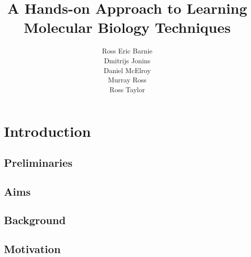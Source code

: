 \documentclass[a4paper]{article}
\title{A Hands-on Approach to Learning Molecular Biology Techniques}
\author{
  Ross Eric Barnie \\
  Dmitrijs Jonins \\
  Daniel McElroy \\
  Murray Ross \\
  Ross Taylor
}
\date{}
\begin{document}
\maketitle
\tableofcontents
\clearpage

\section{Introduction}

\subsection{Preliminaries}


\subsection{Aims}


\subsection{Background}

\subsection{Motivation}


\clearpage


\end{document}

